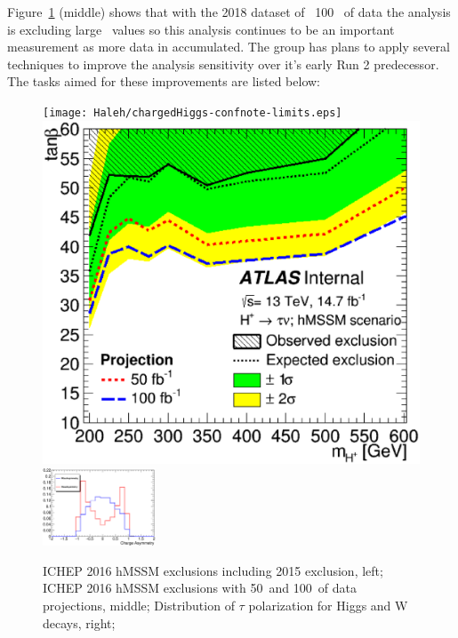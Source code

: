 Figure~\ref{fig:tau} (middle) shows that with the 2018 dataset of ~100 \invfb\ of data the analysis is excluding large \tanb\ values so this analysis continues to be an important measurement as more data in accumulated.
The group has plans to apply several techniques to improve the analysis sensitivity over it's early Run 2 predecessor.  The tasks aimed for these improvements are listed below:




\begin{figure}\label{fig:plot1}
\begin{center}
\texttt{[image: Haleh/chargedHiggs-confnote-limits.eps]}
\includegraphics[height=0.27\textwidth]{Haleh/WithProjection_exclusion_run2016taunu_v2_hmssm_taunu.eps}
\includegraphics[height=0.25\textwidth, width=0.30\textwidth]{Haleh/tauAsy.eps}
\caption{ ICHEP 2016 hMSSM exclusions including 2015 exclusion, left; ICHEP 2016 hMSSM exclusions with 50\invfb\ and 100\invfb\ of data projections, middle; Distribution of $\tau$ polarization for Higgs and W decays, right;}
\label{fig:tau}
\end{center}
\end{figure}

